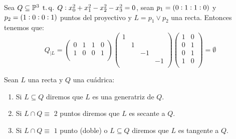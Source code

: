 \begin{example}
  Sea $Q\subseteq \mathbb{P}^3 \operatorname{\;t.q.\;} Q:x^2_0 +x^2_1 -x^2_2-x^2_3=0$, sean $p_1=\left( 0:1:1:0\right)$ y $p_2=\left( 
  1:0:0:1\right)$ puntos del proyectivo y $L=p_1 \vee p_2$ una recta. Entonces tenemos que:
  \[
    Q_{|L}=
    \begin{pmatrix}
      0 & 1 & 1 & 0\\
      1 & 0 & 0 & 1\\
    \end{pmatrix}
    \begin{pmatrix}
      1 & & &\\
      & 1 & &\\
      & & -1 &\\
      & & & -1\\
    \end{pmatrix}
    \begin{pmatrix}
      1 & 0\\
      0 & 1\\
      0 & 1\\
      1 & 0\\
    \end{pmatrix}
    =\emptyset
  \]
  \label{exampleLinQ}
\end{example}

\begin{defi}
  Sean $L$ una recta y $Q$ una cuádrica:
  \begin{enumerate}[(1)]
    \item Si $L\subseteq Q$ diremos que $L$ es una generatriz de $Q$.
    \item Si $L\cap Q \equiv$ $2$ puntos diremos que $L$ es secante a $Q$.
    \item Si $L\cap Q \equiv$ $1$ punto (doble) o $L \subseteq Q$
    diremos que $L$ es tangente a $Q$.
  \end{enumerate}
\end{defi}


